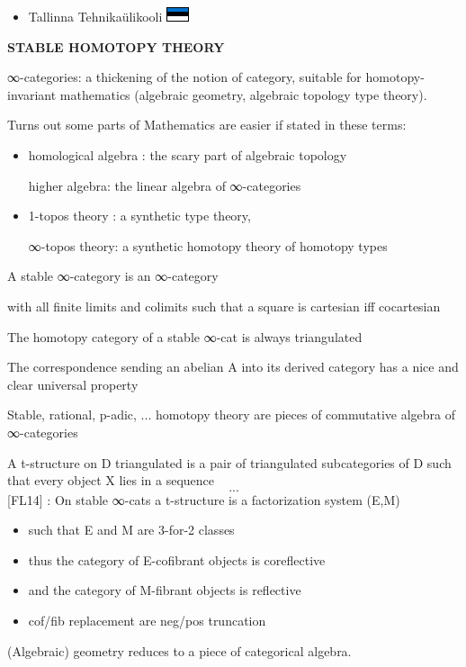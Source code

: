\documentclass{beamer}
\begin{document}
\begin{frame}
\begin{itemize}
    \item Tallinna Tehnikaülikooli \includegraphics{est.pdf}
    
  \end{itemize}
\end{frame}
%
%
%
%
%
\begin{frame}
  \Huge\centering \bfseries STABLE HOMOTOPY THEORY
\end{frame}
%
\begin{frame}
  \alert{∞-categories}: a thickening of the notion of category, suitable for homotopy-invariant mathematics (algebraic geometry, algebraic topology type theory).
  
  Turns out some parts of Mathematics are easier if stated in these terms:
  \begin{itemize}
    \item homological algebra : the scary part of algebraic topology 
    
    {\footnotesize higher algebra: the linear algebra of ∞-categories}
    \item 1-topos theory : a synthetic type theory,
    
    {\footnotesize ∞-topos theory: a synthetic homotopy theory of homotopy types}
  \end{itemize}
\end{frame}
%
%
%
%
%
\begin{frame}
  A stable ∞-category is an ∞-category

with all finite limits and colimits
such that a square is cartesian iff cocartesian

The homotopy category of a stable ∞-cat is always triangulated

The correspondence sending an abelian A into its derived category has a nice and clear universal property

Stable, rational, p-adic, ...  homotopy theory are pieces of commutative algebra of  ∞-categories
\end{frame}
%
%
%
%
%
\begin{frame}
  A t-structure on D triangulated is a pair of triangulated subcategories of D such that every object X lies in a sequence
\[...\]
[FL14] : On stable ∞-cats a t-structure is a factorization system (E,M)
\begin{itemize}
\item such that E and M are 3-for-2 classes
\item thus the category of E-cofibrant objects is coreflective
\item and the category of M-fibrant objects is reflective
\item cof/fib replacement are neg/pos truncation
\end{itemize}
(Algebraic) geometry reduces to a piece of categorical algebra.
\end{frame}
\end{document}
